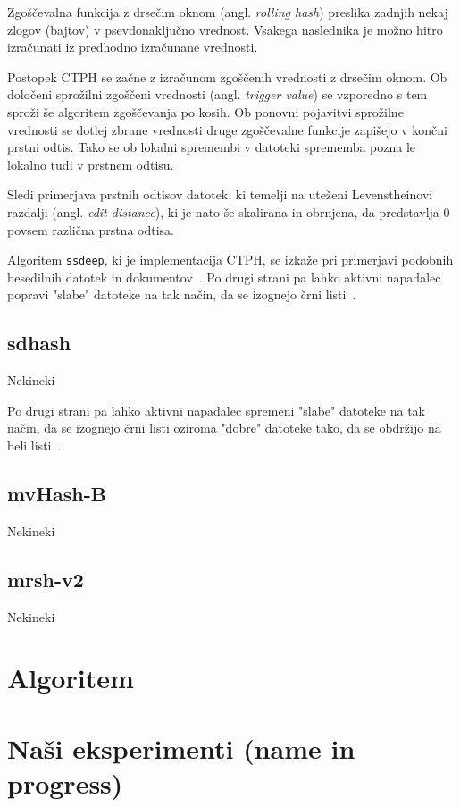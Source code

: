 \documentclass{acm_proc_article-sp}
\begin{document}
Zgoščevalna funkcija z drsečim oknom (angl. \emph{rolling hash}) preslika zadnjih nekaj zlogov (bajtov) v psevdonaključno vrednost. Vsakega naslednika je možno hitro izračunati iz predhodno izračunane vrednosti.

Postopek CTPH se začne z izračunom zgoščenih vrednosti z drsečim oknom. Ob določeni sprožilni zgoščeni vrednosti (angl. \emph{trigger value}) se vzporedno s tem sproži še algoritem zgoščevanja po kosih. Ob ponovni pojavitvi sprožilne vrednosti se dotlej zbrane vrednosti druge zgoščevalne funkcije zapišejo v končni prstni odtis.
Tako se ob lokalni spremembi v datoteki sprememba pozna le lokalno tudi v prstnem odtisu.

Sledi primerjava prstnih odtisov datotek, ki temelji na uteženi Levenstheinovi razdalji (angl. \emph{edit distance}), ki je nato še skalirana in obrnjena, da predstavlja $0$ povsem različna prstna odtisa.

Algoritem \texttt{ssdeep}, ki je implementacija CTPH, se izkaže pri primerjavi podobnih besedilnih datotek in dokumentov~\cite{kornblum:ctph}. Po drugi strani pa lahko aktivni napadalec popravi "slabe" datoteke na tak način, da se izognejo črni listi~\cite{fbhash}.

\subsection{sdhash}
Nekineki \cite{roussev:sdhash}

 Po drugi strani pa lahko aktivni napadalec spremeni "slabe" datoteke na tak način, da se izognejo črni listi oziroma "dobre" datoteke tako, da se obdržijo na beli listi~\cite{breitinge2012security}.

\subsection{mvHash-B}
Nekineki \cite{mvhash-b}

\subsection{mrsh-v2}
Nekineki \cite{mrsh-v2}

\section{Algoritem}

\section{Na\v{s}i eksperimenti (name in progress)}
\end{document}
